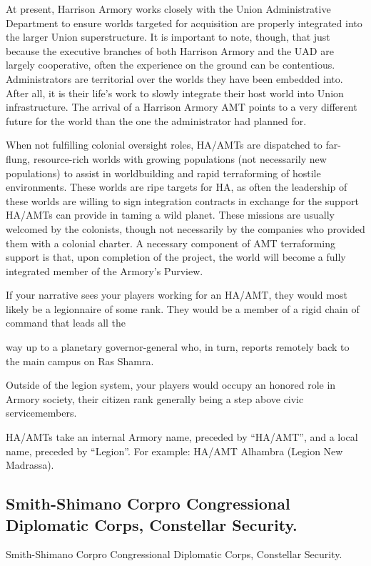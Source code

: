 At present, Harrison Armory works closely with the Union Administrative Department to ensure
worlds targeted for acquisition are properly integrated into the larger Union superstructure. It is
important to note, though, that just because the executive branches of both Harrison Armory and
the UAD are largely cooperative, often the experience on the ground can be contentious.
Administrators are territorial over the worlds they have been embedded into. After all, it is their
life’s work to slowly integrate their host world into Union infrastructure. The arrival of a Harrison
Armory AMT points to a very different future for the world than the one the administrator had
planned for.


When not fulfilling colonial oversight roles, HA/AMTs are dispatched to far-flung, resource-rich
worlds with growing populations (not necessarily new populations) to assist in worldbuilding and
rapid terraforming of hostile environments. These worlds are ripe targets for HA, as often the
leadership of these worlds are willing to sign integration contracts in exchange for the support
HA/AMTs can provide in taming a wild planet. These missions are usually welcomed by the
colonists, though not necessarily by the companies who provided them with a colonial charter. A
necessary component of AMT terraforming support is that, upon completion of the project, the
world will become a fully integrated member of the Armory’s Purview.


If your narrative sees your players working for an HA/AMT, they would most likely be a
legionnaire of some rank. They would be a member of a rigid chain of command that leads all the




way up to a planetary governor-general who, in turn, reports remotely back to the main campus
on Ras Shamra.


Outside of the legion system, your players would occupy an honored role in Armory society, their
citizen rank generally being a step above civic servicemembers.


HA/AMTs take an internal Armory name, preceded by “HA/AMT”, and a local name, preceded by
“Legion”. For example: HA/AMT Alhambra (Legion New Madrassa).

\subsection{Smith-Shimano Corpro Congressional Diplomatic Corps, Constellar Security.}
Smith-Shimano Corpro Congressional Diplomatic Corps, Constellar
Security.

